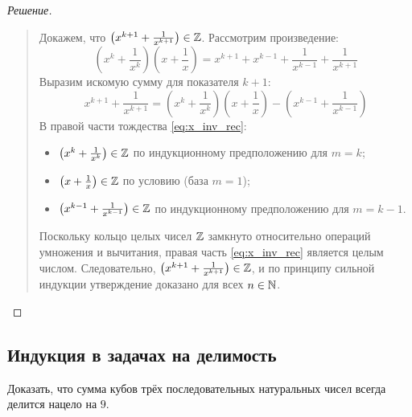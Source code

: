 \begin{proof}[Решение]
\begin{quote}
        Докажем, что $\left(x^{k+1} + \frac{1}{x^{k+1}}\right) \in \mathbb{Z}$. 
        Рассмотрим произведение:
        \[
            \left(x^k + \frac{1}{x^k}\right) \left(x + \frac{1}{x}\right) = 
            x^{k+1} + x^{k-1} + \frac{1}{x^{k-1}} + \frac{1}{x^{k+1}}
        \]
        Выразим искомую сумму для показателя $k + 1$:
        \begin{equation} \label{eq:x_inv_rec}
            x^{k+1} + \frac{1}{x^{k+1}} = 
            \left(x^k + \frac{1}{x^k}\right) \left(x + \frac{1}{x}\right) - 
            \left(x^{k-1} + \frac{1}{x^{k-1}}\right) \tag{4}
        \end{equation}
        В правой части тождества \eqref{eq:x_inv_rec}:
        \begin{itemize}
            \item $\left(x^k + \frac{1}{x^k}\right) \in \mathbb{Z}$ по 
            индукционному предположению для $m = k$;
            \item $\left(x + \frac{1}{x}\right) \in \mathbb{Z}$ по условию (база 
            $m = 1$);
            \item $\left(x^{k-1} + \frac{1}{x^{k-1}}\right) \in \mathbb{Z}$ по 
            индукционному предположению для $m = k - 1$.
        \end{itemize}
        Поскольку кольцо целых чисел $\mathbb{Z}$ замкнуто относительно операций 
        умножения и вычитания, правая часть \eqref{eq:x_inv_rec} является 
        целым числом. Следовательно, 
        $\left(x^{k+1} + \frac{1}{x^{k+1}}\right) \in \mathbb{Z}$, и по принципу 
        сильной индукции утверждение доказано для всех $n \in \mathbb{N}$.
    \end{quote}
\end{proof}

\subsection{Индукция в задачах на делимость}

\begin{problem}
    Доказать, что сумма кубов трёх последовательных натуральных чисел 
    всегда делится нацело на $9$.
\end{problem}

